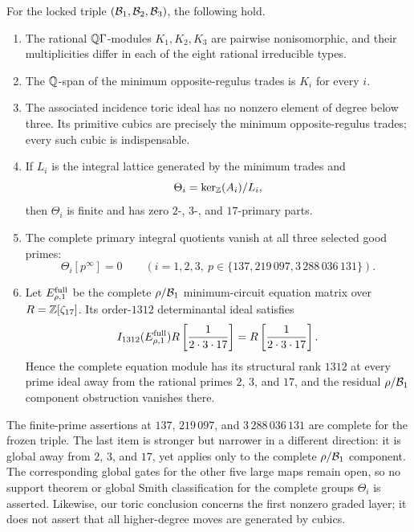 \begin{theorem}
\label{thm:main}
For the locked triple \((\mathcal B_1,\mathcal B_2,\mathcal B_3)\), the following hold.
\begin{enumerate}[label=\textup{(\roman*)}]
  \item The rational \(\mathbb Q\Gamma\)-modules \(K_1,K_2,K_3\) are pairwise
  nonisomorphic, and their multiplicities differ in each of the eight
  rational irreducible types.
  \item The \(\mathbb Q\)-span of the minimum opposite-regulus trades is \(K_i\)
  for every \(i\).
  \item The associated incidence toric ideal has no nonzero element of
  degree below three.  Its primitive cubics are precisely the minimum
  opposite-regulus trades; every such cubic is indispensable.
  \item If \(L_i\) is the integral lattice generated by the minimum
  trades and
  \[
     \Theta_i=\ker_{\mathbb Z}(A_i)/L_i,
  \]
  then \(\Theta_i\) is finite and has zero \(2\)-, \(3\)-, and
  \(17\)-primary parts.
  \item The complete primary integral quotients vanish at all three selected
  good primes:
  \[
    \Theta_i[p^\infty]=0
    \qquad
    (i=1,2,3,\ p\in\{137,219\,097,3\,288\,036\,131\}).
  \]
  \item Let \(E_{\rho,1}^{\mathrm{full}}\) be the complete
  \(\rho/\mathcal B_1\) minimum-circuit equation matrix over
  \(R=\mathbb Z[\zeta_{17}]\).  Its order-\(1312\) determinantal ideal satisfies
  \[
    I_{1312}(E_{\rho,1}^{\mathrm{full}})
    R\left[\frac1{2\cdot3\cdot17}\right]
    =
    R\left[\frac1{2\cdot3\cdot17}\right].
  \]
  Hence the complete equation module has its structural rank \(1312\)
  at every prime ideal away from the rational primes \(2\), \(3\), and
  \(17\), and the residual \(\rho/\mathcal B_1\) component obstruction vanishes
  there.
\end{enumerate}
\end{theorem}

The finite-prime assertions at \(137\), \(219\,097\), and
\(3\,288\,036\,131\) are complete for the frozen triple.  The last item
is stronger but narrower in a different direction: it is global away from
\(2\), \(3\), and \(17\), yet applies only to the complete
\(\rho/\mathcal B_1\) component.  The corresponding global gates for the other
five large maps remain open, so no support theorem or global Smith
classification for the complete groups \(\Theta_i\) is asserted.
Likewise, our toric conclusion concerns the first nonzero graded layer; it
does not assert that all higher-degree moves are generated by cubics.

